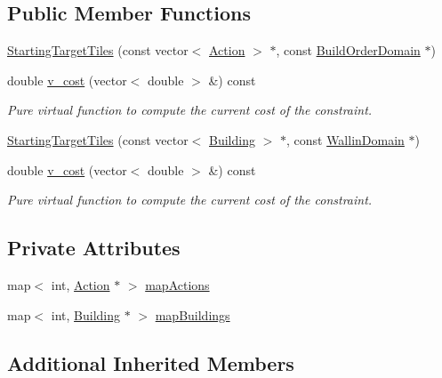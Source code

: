 \subsection*{Public Member Functions}
\begin{DoxyCompactItemize}
\item 
\hyperlink{classghost_1_1StartingTargetTiles_a1b4b7834fdd5b1dd7eef0ef5650a1862}{Starting\-Target\-Tiles} (const vector$<$ \hyperlink{classghost_1_1Action}{Action} $>$ $\ast$, const \hyperlink{classghost_1_1BuildOrderDomain}{Build\-Order\-Domain} $\ast$)
\item 
double \hyperlink{classghost_1_1StartingTargetTiles_aa9474c7fb81691a2059d2e5614702544}{v\-\_\-cost} (vector$<$ double $>$ \&) const 
\begin{DoxyCompactList}\small\item\em Pure virtual function to compute the current cost of the constraint. \end{DoxyCompactList}\item 
\hyperlink{classghost_1_1StartingTargetTiles_a6c2b6cf28fb668cfe7909396679d2587}{Starting\-Target\-Tiles} (const vector$<$ \hyperlink{classghost_1_1Building}{Building} $>$ $\ast$, const \hyperlink{classghost_1_1WallinDomain}{Wallin\-Domain} $\ast$)
\item 
double \hyperlink{classghost_1_1StartingTargetTiles_aa9474c7fb81691a2059d2e5614702544}{v\-\_\-cost} (vector$<$ double $>$ \&) const 
\begin{DoxyCompactList}\small\item\em Pure virtual function to compute the current cost of the constraint. \end{DoxyCompactList}\end{DoxyCompactItemize}
\subsection*{Private Attributes}
\begin{DoxyCompactItemize}
\item 
map$<$ int, \hyperlink{classghost_1_1Action}{Action} $\ast$ $>$ \hyperlink{classghost_1_1StartingTargetTiles_a09044317698eebe778e8c5eeb3e58ff2}{map\-Actions}
\item 
map$<$ int, \hyperlink{classghost_1_1Building}{Building} $\ast$ $>$ \hyperlink{classghost_1_1StartingTargetTiles_a08e51275da85bfaa8a108976cbd133e2}{map\-Buildings}
\end{DoxyCompactItemize}
\subsection*{Additional Inherited Members}


